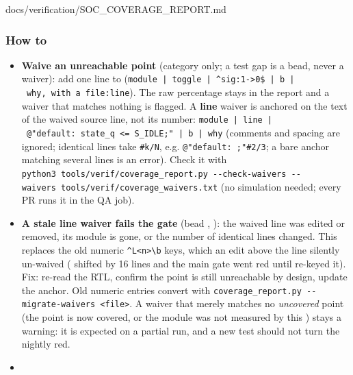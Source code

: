 \begin{relocated}{docs/verification/SOC_COVERAGE_REPORT.md}
\subsubsection{How to}\label{tm:flow:soc-coverage-report:how-to}

\begin{itemize}
\tightlist
\item
  \textbf{Waive an unreachable point} (category  only; a test
  gap is a bead, never a waiver): add one line to
  (\texttt{module\ |\ toggle\ |\ \textasciicircum{}sig:\allowbreak{}1-\allowbreak{}>0\$\ |\ b\ |\ why,\allowbreak{}\ with\ a\ file:\allowbreak{}line}).
  The raw percentage stays in the report and a waiver that matches
  nothing is flagged. A \textbf{line} waiver is anchored on the text of
  the waived source line, not its number:
  \texttt{module\ |\ line\ |\ @"default:\allowbreak{}\ state\_\allowbreak{}q\ <=\allowbreak{}\ S\_\allowbreak{}IDLE;"\ |\ b\ |\ why}
  (comments and spacing are ignored; identical lines take
  \texttt{\#k/\allowbreak{}N}, e.g.
  \texttt{@"default:\allowbreak{}\ ;"\#2/\allowbreak{}3}; a bare anchor
  matching several lines is an error). Check it with
  \texttt{python3\ tools/\allowbreak{}verif/\allowbreak{}coverage\_\allowbreak{}report.\allowbreak{}py\ -\allowbreak{}-\allowbreak{}check-\allowbreak{}waivers\ -\allowbreak{}-\allowbreak{}waivers\ tools/\allowbreak{}verif/\allowbreak{}coverage\_\allowbreak{}waivers.\allowbreak{}txt}
  (no simulation needed; every PR runs it in the QA job).
\item
  \textbf{A stale line waiver fails the gate} (bead ,
  ): the waived line was edited or removed, its
  module is gone, or the number of identical lines changed. This
  replaces the old numeric
  \texttt{\textasciicircum{}L<n>\textbackslash{}b} keys, which an edit
  above the line silently un-waived ( shifted
   by 16 lines and the main gate went red until
   re-keyed it). Fix: re-read the RTL, confirm the point is
  still unreachable by design, update the anchor. Old numeric entries
  convert with
  \texttt{coverage\_\allowbreak{}report.\allowbreak{}py\ -\allowbreak{}-\allowbreak{}migrate-\allowbreak{}waivers\ <file>}.
  A waiver that merely matches no \emph{uncovered} point (the point is
  now covered, or the module was not measured by this ) stays
  a warning: it is expected on a partial run, and a new test should not
  turn the nightly red.
\item

\end{itemize}
\end{relocated}
